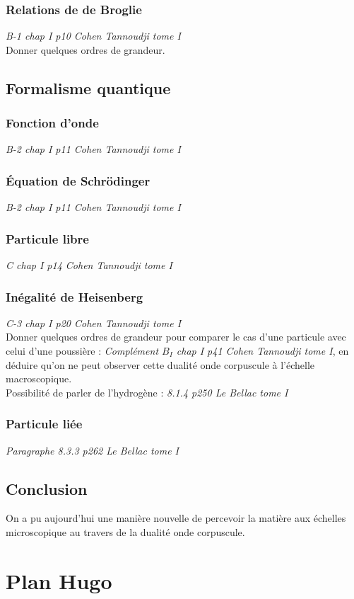 \documentclass[12pt,prb,aps,epsf]{report}
\begin{document}
\subsection{Relations de de Broglie}
\textit{B-1 chap I p10 Cohen Tannoudji tome I}\\
Donner quelques ordres de grandeur.

\section{Formalisme quantique}
\subsection{Fonction d'onde}
\textit{B-2 chap I p11 Cohen Tannoudji tome I}
\subsection{Équation de Schrödinger}
\textit{B-2 chap I p11 Cohen Tannoudji tome I}
\subsection{Particule libre}
\textit{C chap I p14 Cohen Tannoudji tome I}
\subsection{Inégalité de Heisenberg}
\textit{C-3 chap I p20 Cohen Tannoudji tome I}\\
Donner quelques ordres de grandeur pour comparer le cas d'une particule avec celui d'une poussière : \textit{Complément $B_I$ chap I p41 Cohen Tannoudji tome I}, en déduire qu'on ne peut observer cette dualité onde corpuscule à l'échelle macroscopique.\\
Possibilité de parler de l'hydrogène : \textit{8.1.4 p250 Le Bellac tome I}
\subsection{Particule liée}
\textit{Paragraphe 8.3.3 p262 Le Bellac tome I}

\section{Conclusion}
On a pu aujourd'hui une manière nouvelle de percevoir la matière aux échelles microscopique au travers de la dualité onde corpuscule. 

\chapter{Plan Hugo}	
\end{document}
